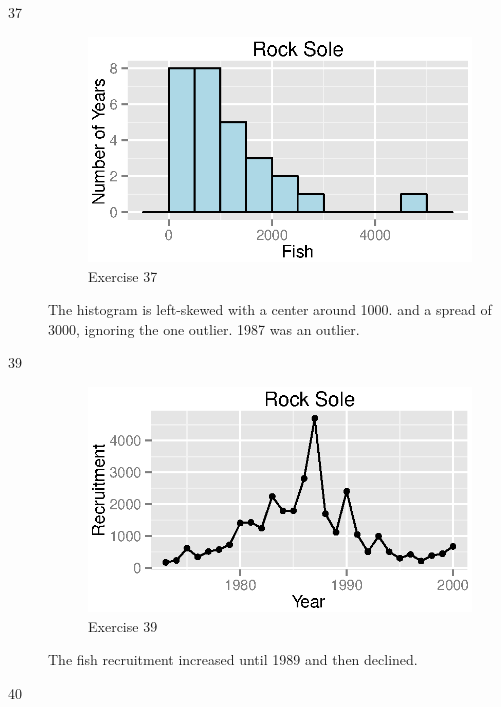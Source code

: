 \documentclass{exam}
\begin{document}
\begin{description}
      \item[37]
        \begin{figure}[H]
          \centering
          \includegraphics{figures/ex37.eps}
          \caption{Exercise 37}
        \end{figure}

        The histogram is left-skewed with a center around 1000. and a spread of
        3000, ignoring the one outlier.  1987 was an outlier. 

      \item[39]
        \begin{figure}[H]
          \centering
          \includegraphics{figures/ex39.eps}
          \caption{Exercise 39}
        \end{figure}

        The fish recruitment increased until 1989 and then declined.

      \item[40]
\end{description}
\end{document}
